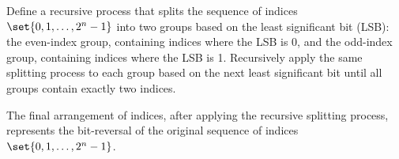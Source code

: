 Define a recursive process that splits the sequence of indices $\set{0, 1, \ldots, 2^n - 1}$ into two groups based on the least significant bit (LSB): the even-index group, containing indices where the LSB is 0, and the odd-index group, containing indices where the LSB is 1. Recursively apply the same splitting process to each group based on the next least significant bit until all groups contain exactly two indices.




\begin{proposition} \label{proposition: bit reversal}
	The final arrangement of indices, after applying the recursive splitting process, represents the bit-reversal of the original sequence of indices $\set{0, 1, \ldots, 2^n - 1}$.
\end{proposition}


